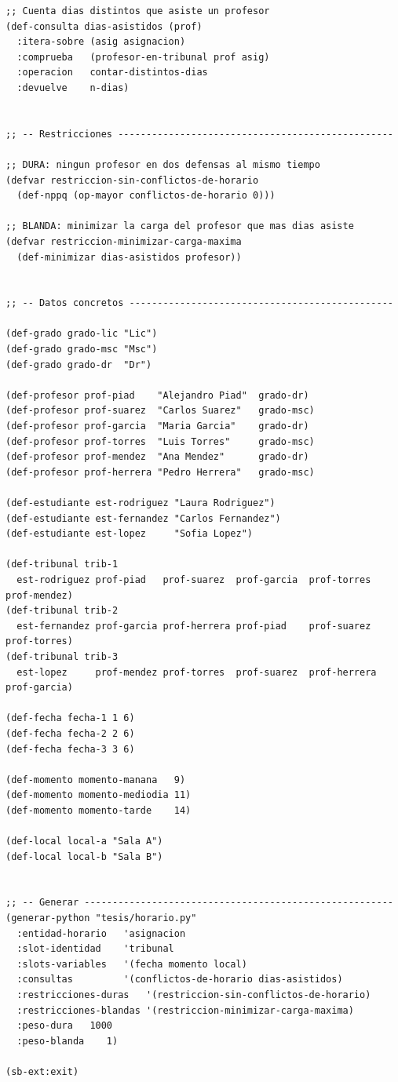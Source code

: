 \documentclass[12pt,a4paper]{article}
\begin{document}
\begin{lstlisting}[style=lisp, caption={Archivo completo: tesis/dominio.lisp}]
;; Cuenta dias distintos que asiste un profesor
(def-consulta dias-asistidos (prof)
  :itera-sobre (asig asignacion)
  :comprueba   (profesor-en-tribunal prof asig)
  :operacion   contar-distintos-dias
  :devuelve    n-dias)


;; -- Restricciones -------------------------------------------------

;; DURA: ningun profesor en dos defensas al mismo tiempo
(defvar restriccion-sin-conflictos-de-horario
  (def-nppq (op-mayor conflictos-de-horario 0)))

;; BLANDA: minimizar la carga del profesor que mas dias asiste
(defvar restriccion-minimizar-carga-maxima
  (def-minimizar dias-asistidos profesor))


;; -- Datos concretos -----------------------------------------------

(def-grado grado-lic "Lic")
(def-grado grado-msc "Msc")
(def-grado grado-dr  "Dr")

(def-profesor prof-piad    "Alejandro Piad"  grado-dr)
(def-profesor prof-suarez  "Carlos Suarez"   grado-msc)
(def-profesor prof-garcia  "Maria Garcia"    grado-dr)
(def-profesor prof-torres  "Luis Torres"     grado-msc)
(def-profesor prof-mendez  "Ana Mendez"      grado-dr)
(def-profesor prof-herrera "Pedro Herrera"   grado-msc)

(def-estudiante est-rodriguez "Laura Rodriguez")
(def-estudiante est-fernandez "Carlos Fernandez")
(def-estudiante est-lopez     "Sofia Lopez")

(def-tribunal trib-1
  est-rodriguez prof-piad   prof-suarez  prof-garcia  prof-torres  prof-mendez)
(def-tribunal trib-2
  est-fernandez prof-garcia prof-herrera prof-piad    prof-suarez  prof-torres)
(def-tribunal trib-3
  est-lopez     prof-mendez prof-torres  prof-suarez  prof-herrera prof-garcia)

(def-fecha fecha-1 1 6)
(def-fecha fecha-2 2 6)
(def-fecha fecha-3 3 6)

(def-momento momento-manana   9)
(def-momento momento-mediodia 11)
(def-momento momento-tarde    14)

(def-local local-a "Sala A")
(def-local local-b "Sala B")


;; -- Generar -------------------------------------------------------
(generar-python "tesis/horario.py"
  :entidad-horario   'asignacion
  :slot-identidad    'tribunal
  :slots-variables   '(fecha momento local)
  :consultas         '(conflictos-de-horario dias-asistidos)
  :restricciones-duras   '(restriccion-sin-conflictos-de-horario)
  :restricciones-blandas '(restriccion-minimizar-carga-maxima)
  :peso-dura   1000
  :peso-blanda    1)

(sb-ext:exit)
\end{lstlisting}
\end{document}
